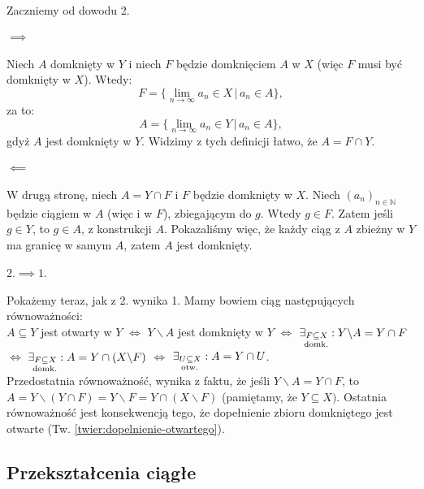 \documentclass{article}
\newcounter{defi}
\numberwithin{defi}{section}
\numberwithin{defi}{section}
\newcommand{\N}{\mathbb{N}}
\newcommand{\oo}{\infty}
\newcommand{\subotw}{\underset{\clap{\scriptsize otw.}}{\subseteq}}
\newcommand{\subdomk}{\underset{\clap{\scriptsize domk.}}{\subseteq}}
\newcommand{\ciag}[1]{(#1_{n})_{n \in \N}}
\begin{document}
\begin{dow}
    Zaczniemy od dowodu 2.
    \paragraph{$\implies$} Niech $A$ domknięty w $Y$ i niech $F$ będzie domknięciem $A$ w $X$ (więc $F$ musi być domknięty w $X$). Wtedy: \begin{equation*}
        F = \{ \lim_{n \to \oo} a_n \in X \, \big| \, a_n \in A \},
    \end{equation*} za to:\begin{equation*}
        A = \{ \lim_{n \to \oo} a_n \in Y \, \big| \, a_n \in A \},
    \end{equation*}gdyż $A$ jest domknięty w $Y$. Widzimy z tych definicji łatwo, że $A = F \cap Y$.
    \paragraph{$\impliedby$} W drugą stronę, niech $A = Y \cap F$ i $F$ będzie domknięty w $X$. Niech $\ciag{a}$ będzie ciągiem w $A$ (więc i w $F$), zbiegającym do $g$. Wtedy $g \in F$. Zatem jeśli $g \in Y$, to $g \in A$, z konstrukcji $A$. Pokazaliśmy więc, że każdy ciąg z $A$ zbieżny w $Y$ ma granicę w samym $A$, zatem $A$ jest domknięty.
    \paragraph{$2. \implies 1.$} Pokażemy teraz, jak z 2. wynika 1. Mamy bowiem ciąg następujących równoważności: \\
    $A \subseteq Y$ jest otwarty w $Y$ $\iff$ $Y \backslash A$ jest domknięty w $Y$ $\iff$ $\exists_{F \subdomk X}: Y \backslash A = Y \cap F$ $\iff$ $ \exists_{F \subdomk X}: A = Y \cap (X \backslash F)$ $\iff$ $\exists_{U \subotw X}: A = Y \cap U$.\\
    Przedostatnia równoważność, wynika z faktu, że jeśli $Y \backslash A = Y \cap F$, to $A = Y \backslash (Y \cap F) = Y \backslash F =Y \cap (X \backslash F)$ (pamiętamy, że $Y\subseteq X)$.
    Ostatnia równoważność jest konsekwencją tego, że dopełnienie zbioru domkniętego jest otwarte (Tw. \ref{twier:dopelnienie-otwartego}).
\end{dow}

\subsection{Przekształcenia ciągłe}
\end{document}
